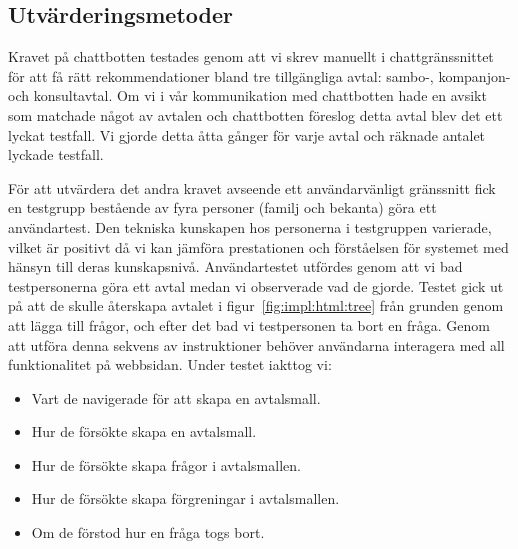 \documentclass[a4paper,12pt]{article}
\begin{document}


\subsection{Utvärderingsmetoder}
Kravet på chattbotten testades genom att vi skrev manuellt i chattgränssnittet för att få rätt rekommendationer bland tre tillgängliga avtal: sambo-, kompanjon- och konsultavtal. Om vi i vår kommunikation med chattbotten hade en avsikt som matchade något av avtalen och chattbotten föreslog detta avtal blev det ett lyckat testfall. Vi gjorde detta åtta gånger för varje avtal och räknade antalet lyckade testfall. 

För att utvärdera det andra kravet avseende ett användarvänligt gränssnitt fick en testgrupp bestående av fyra personer (familj och bekanta) göra ett användartest. Den tekniska kunskapen hos personerna i testgruppen varierade, vilket är positivt då vi kan jämföra prestationen och förståelsen för systemet med hänsyn till deras kunskapsnivå. Användartestet utfördes genom att vi bad testpersonerna göra ett avtal medan vi observerade vad de gjorde. Testet gick ut på att de skulle återskapa avtalet i figur~\ref{fig:impl:html:tree} från grunden genom att lägga till frågor, och efter det bad vi testpersonen ta bort en fråga. Genom att utföra denna sekvens av instruktioner behöver användarna interagera med all funktionalitet på webbsidan. Under testet iakttog vi:
\begin{itemize}
    \item Vart de navigerade för att skapa en avtalsmall.
    \item Hur de försökte skapa en avtalsmall.
    \item Hur de försökte skapa frågor i avtalsmallen.
    \item Hur de försökte skapa förgreningar i avtalsmallen.
    \item Om de förstod hur en fråga togs bort.
\end{itemize}
\end{document}
